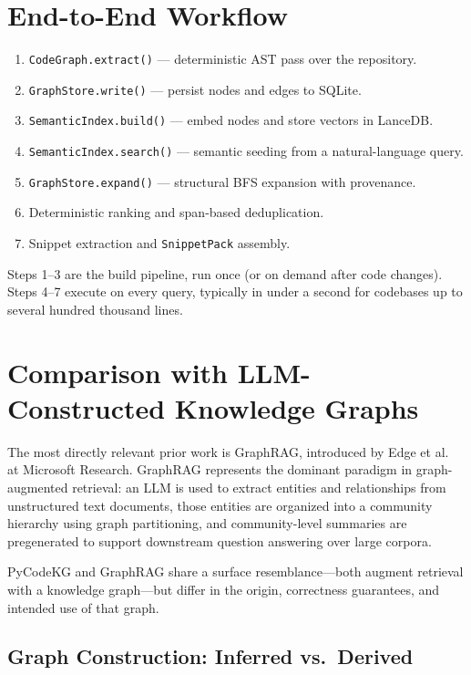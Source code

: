 \documentclass[10pt]{article}
\begin{document}
\section{End-to-End Workflow}

\begin{enumerate}
\item \texttt{CodeGraph.extract()} --- deterministic AST pass over the repository.
\item \texttt{GraphStore.write()} --- persist nodes and edges to SQLite.
\item \texttt{SemanticIndex.build()} --- embed nodes and store vectors in LanceDB.
\item \texttt{SemanticIndex.search()} --- semantic seeding from a natural-language
query.
\item \texttt{GraphStore.expand()} --- structural BFS expansion with provenance.
\item Deterministic ranking and span-based deduplication.
\item Snippet extraction and \texttt{SnippetPack} assembly.
\end{enumerate}

Steps 1--3 are the build pipeline, run once (or on demand after code changes).
Steps 4--7 execute on every query, typically in under a second for codebases up to
several hundred thousand lines.

\section{Comparison with LLM-Constructed Knowledge Graphs}
\label{sec:comparison}

The most directly relevant prior work is GraphRAG, introduced by Edge
et al.~\cite{edge2024graphrag} at Microsoft Research. GraphRAG represents the
dominant paradigm in graph-augmented retrieval: an LLM is used to extract entities
and relationships from unstructured text documents, those entities are organized into
a community hierarchy using graph partitioning, and community-level summaries are
pregenerated to support downstream question answering over large corpora.

PyCodeKG and GraphRAG share a surface resemblance---both augment retrieval with a
knowledge graph---but differ in the origin, correctness guarantees, and intended
use of that graph.

\subsection{Graph Construction: Inferred vs.\ Derived}
\end{document}
